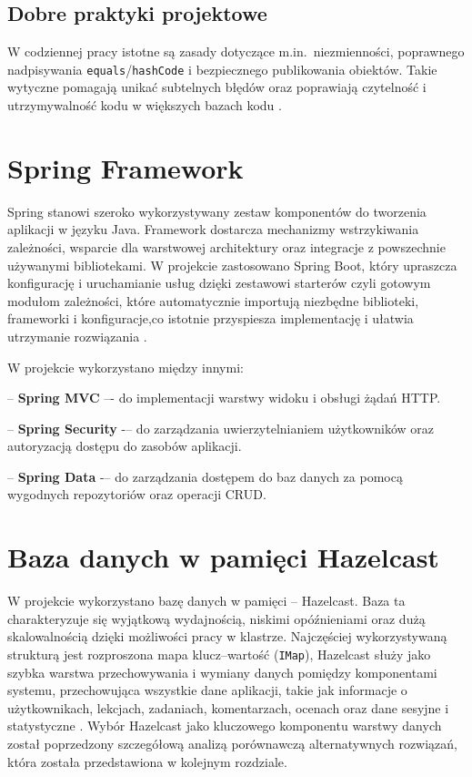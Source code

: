\subsection*{Dobre praktyki projektowe}
W codziennej pracy istotne są zasady dotyczące m.in.\ niezmienności, poprawnego nadpisywania \texttt{equals}/\texttt{hashCode} i bezpiecznego publikowania obiektów. Takie wytyczne pomagają unikać subtelnych błędów oraz poprawiają czytelność i utrzymywalność kodu w większych bazach kodu \cite{effective-java-3e}.

\section{Spring Framework}

Spring stanowi szeroko wykorzystywany zestaw komponentów do tworzenia aplikacji w języku Java. Framework dostarcza mechanizmy wstrzykiwania zależności, wsparcie dla warstwowej architektury oraz integracje z powszechnie używanymi bibliotekami. W projekcie zastosowano Spring Boot, który upraszcza konfigurację i uruchamianie usług dzięki zestawowi starterów czyli gotowym modułom zależności, które automatycznie importują niezbędne biblioteki, frameworki i konfiguracje,co istotnie przyspiesza implementację i ułatwia utrzymanie rozwiązania \cite{spring-boot}.

W projekcie wykorzystano między innymi:

– \textbf{Spring MVC} –- do implementacji warstwy widoku i obsługi żądań HTTP.

– \textbf{Spring Security} -– do zarządzania uwierzytelnianiem użytkowników oraz autoryzacją dostępu do zasobów aplikacji.

– \textbf{Spring Data} -– do zarządzania dostępem do baz danych za pomocą wygodnych repozytoriów oraz operacji CRUD.

\section{Baza danych w pamięci Hazelcast}

W projekcie wykorzystano bazę danych w pamięci  – Hazelcast. Baza ta charakteryzuje się wyjątkową wydajnością, niskimi opóźnieniami oraz dużą skalowalnością dzięki możliwości pracy w klastrze. Najczęściej wykorzystywaną strukturą jest rozproszona mapa klucz–wartość (\texttt{IMap}), Hazelcast służy jako szybka warstwa przechowywania i wymiany danych pomiędzy komponentami systemu, przechowująca wszystkie dane aplikacji, takie jak informacje o użytkownikach, lekcjach, zadaniach, komentarzach, ocenach oraz dane sesyjne i statystyczne \cite{hazelcast-docs}. Wybór Hazelcast jako kluczowego komponentu warstwy danych został poprzedzony szczegółową analizą porównawczą alternatywnych rozwiązań, która została przedstawiona w kolejnym rozdziale.

